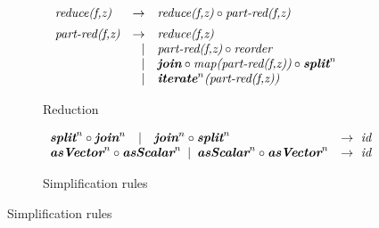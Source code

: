 \begin{figure}[t]
\vspace{\ruleSpace}
\begin{subfigure}[b]{1\linewidth}
\begin{mdframed}
$$
\begin{array}{lrl}
\pat{reduce(f,z)} & \rightarrow & \pat{reduce(f,z)} \circ \pat{part-red(f,z)}\\[.5em]
\pat{part-red(f,z)} & \rightarrow & \pat{reduce(f,z)}\\                                                      
 &| & \pat{part-red(f,z)} \circ \pat{reorder}\\    
 &| & \pat{\textbf{join}} \circ \pat{map(part-red(f,z))} \circ \pat{\textbf{split}}^n\\
 &| & \pat{\textbf{iterate}}^{n}\pat{(part-red(f,z))}\\
\end{array}
%
$$
\end{mdframed}
 \caption{Reduction}
 \label{fig:algo:red}
\end{subfigure}


\vspace{\ruleSpace}
\begin{subfigure}[b]{1\linewidth}
\begin{mdframed}
$$
\begin{array}{lr}
\textit{\textbf{split}}^n \circ \textit{\textbf{join}}^n \hspace{1em} |\hspace{1em} \textit{\textbf{join}}^n \circ \textit{\textbf{split}}^n & \rightarrow \ \textit{id}\\
\textit{\textbf{asVector}}^n \circ \textit{\textbf{asScalar}}^n \hspace{.5em} |\hspace{.5em} \textit{\textbf{asScalar}}^n \circ \textit{\textbf{asVector}}^n       & \rightarrow \ \textit{id}\\
\end{array}
$$
\end{mdframed}
 \caption{Simplification rules}
  \label{fig:algo:simpl}
\end{subfigure}


\end{figure}
